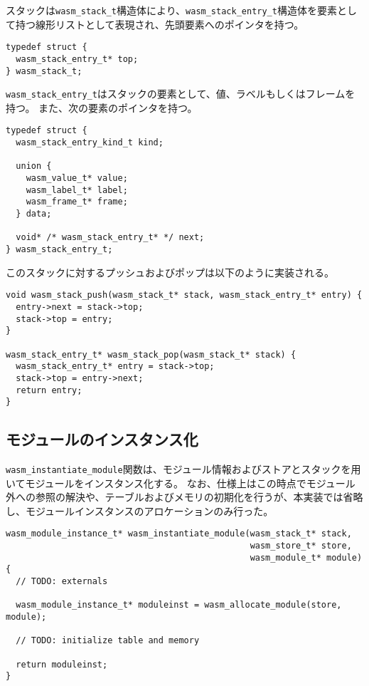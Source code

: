 スタックは\verb|wasm_stack_t|構造体により、\verb|wasm_stack_entry_t|構造体を要素として持つ線形リストとして表現され、先頭要素へのポインタを持つ。

\begin{lstlisting}[caption=スタックの定義,label=lst:parse_sleb128]
typedef struct {
  wasm_stack_entry_t* top;
} wasm_stack_t;
\end{lstlisting}

\verb|wasm_stack_entry_t|はスタックの要素として、値、ラベルもしくはフレームを持つ。
また、次の要素のポインタを持つ。

\begin{lstlisting}[caption=スタックエントリの定義,label=lst:parse_sleb128]
typedef struct {
  wasm_stack_entry_kind_t kind;

  union {
    wasm_value_t* value;
    wasm_label_t* label;
    wasm_frame_t* frame;
  } data;

  void* /* wasm_stack_entry_t* */ next;
} wasm_stack_entry_t;
\end{lstlisting}

このスタックに対するプッシュおよびポップは以下のように実装される。

\begin{lstlisting}[caption=スタック操作の実装,label=lst:parse_sleb128]
void wasm_stack_push(wasm_stack_t* stack, wasm_stack_entry_t* entry) {
  entry->next = stack->top;
  stack->top = entry;
}

wasm_stack_entry_t* wasm_stack_pop(wasm_stack_t* stack) {
  wasm_stack_entry_t* entry = stack->top;
  stack->top = entry->next;
  return entry;
}
\end{lstlisting}

\subsection{モジュールのインスタンス化}

\verb|wasm_instantiate_module|関数は、モジュール情報およびストアとスタックを用いてモジュールをインスタンス化する。
なお、仕様上はこの時点でモジュール外への参照の解決や、テーブルおよびメモリの初期化を行うが、本実装では省略し、モジュールインスタンスのアロケーションのみ行った。

\begin{lstlisting}[caption=モジュールのインスタンス化,label=lst:parse_sleb128]
wasm_module_instance_t* wasm_instantiate_module(wasm_stack_t* stack,
                                                wasm_store_t* store,
                                                wasm_module_t* module) {
  // TODO: externals

  wasm_module_instance_t* moduleinst = wasm_allocate_module(store, module);

  // TODO: initialize table and memory

  return moduleinst;
}
\end{lstlisting}


